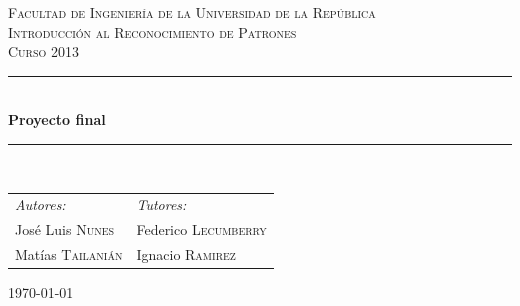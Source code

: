 \documentclass[12pt,a4paper,titlepage]{report}
\newcommand{\HRule}{\rule{\linewidth}{0.5mm}}
\begin{document}
\begin{titlepage}
\begin{center}
\vspace{3cm}
\textsc{\LARGE Facultad de Ingenier\'ia de la Universidad de la Rep\'ublica}\\[1.5cm]
\vspace{2cm}
\textsc{\Large Introducción al Reconocimiento de Patrones  \\[1cm]  Curso 2013}\\[0.5cm]
\vspace{2cm}
\vspace{.7cm}
\HRule \\[1cm]
{ \huge \bfseries Proyecto final}\\[0.4cm]
\HRule \\[1cm]
\vspace{2cm}
\begin{center}
\begin{tabular}{p{}p{}}
\emph{Autores:} & \hfill \emph{Tutores:}\\
José Luis \textsc{Nunes} &  \hfill Federico \textsc{Lecumberry}\\
Mat\'ias \textsc{Tailani\'an} & \hfill Ignacio \textsc{Ramirez}
\end{tabular}
\end{center}

\vspace{1cm}

\vfill
\begin{figure} [h!]
\centering
{}\hspace{1cm}
\hspace{1cm}
\end{figure}

{\large \today}
\end{center}
\end{titlepage}
\end{document}
